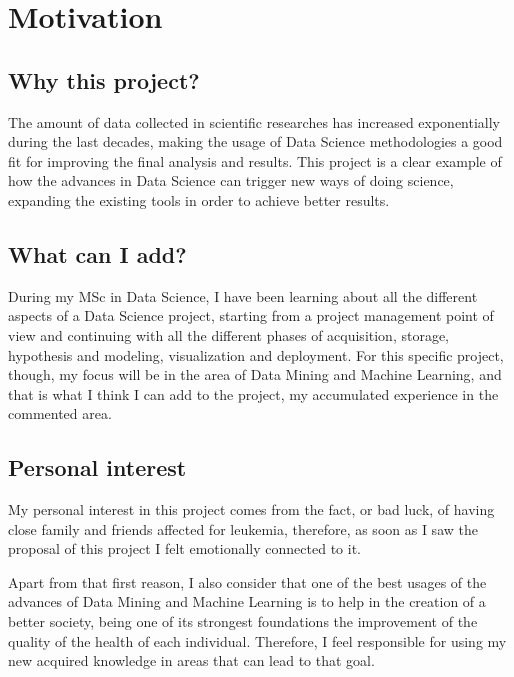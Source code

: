 \onehalfspacing

\section{Motivation}

\subsection{Why this project?}
The amount of data collected in scientific researches has increased exponentially during the last decades, making the usage of Data Science methodologies a good fit for improving the final analysis and results.
This project is a clear example of how the advances in Data Science can trigger new ways of doing science, expanding the existing tools in order to achieve better results.

\subsection{What can I add?}
During my MSc in Data Science, I have been learning about all the different aspects of a Data Science project, starting from a project management point of view and continuing with all the different phases of acquisition, storage, hypothesis and modeling, visualization and deployment.
For this specific project, though, my focus will be in the area of Data Mining and Machine Learning, and that is what I think I can add to the project, my accumulated experience in the commented area.

\subsection{Personal interest}
My personal interest in this project comes from the fact, or bad luck, of having close family and friends affected for leukemia, therefore, as soon as I saw the proposal of this project I felt emotionally connected to it.

Apart from that first reason, I also consider that one of the best usages of the advances of Data Mining and Machine Learning is to help in the creation of a better society, being one of its strongest foundations the improvement of the quality of the health of each individual. Therefore, I feel responsible for using my new acquired knowledge in areas that can lead to that goal.

